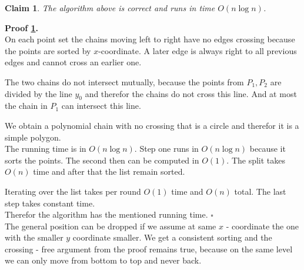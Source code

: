 \documentclass[11pt,a4paper,ngerman]{article}
\newtheorem{lemma}{\bfseries Claim}
\begin{document}
\begin{lemma}\label{alge:ueb5:simp:cor}
    The algorithm above is correct and runs in time $O(n \log n)$.
\end{lemma}

\textbf{Proof \ref{alge:ueb5:simp:cor}.}\\

On each point set the chains moving left to right have no edges crossing because the points
are sorted by $x$-coordinate. A later edge is always right to all previous edges and cannot cross 
an earlier one.

The two chains do not intersect mutually, because the points from $P_1, P_2$ are divided by
the line $y_0$ and therefor the chains do not cross this line. And at most the chain in $P_1$ can 
intersect this line.

We obtain a polynomial chain with no crossing that is a circle and therefor it is a simple polygon.\\

The running time is in $O(n \log n)$.
Step one runs in $O(n \log n)$ because it sorts the points. The second then can be computed in $O(1)$.
The split takes $O(n)$ time and after that the list remain sorted.

Iterating over the list takes per round $O(1)$ time and $O(n)$ total. The last step takes constant time.\\

Therefor the algorithm has the mentioned running time.
\mbox{} \hfill $\square$\\

The general position can be dropped if we assume at same $x$ - coordinate the one with the smaller $y$ coordinate smaller.
We get a consistent sorting and the crossing - free argument from the proof remains true, because on the same level we can only
move from bottom to top and never back.

\label{LastPage}
\end{document}
